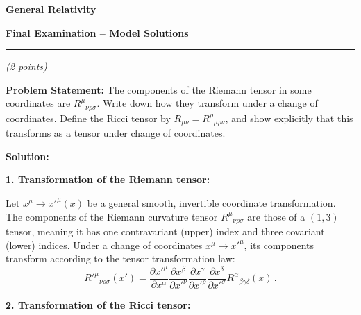 \documentclass[12pt]{article}
\newcommand{\be}{\begin{equation}}
\newcommand{\ee}{\end{equation}}
\newcounter{quesno}
\newcommand{\ques}[1]{\vspace{2em}\stepcounter{quesno}
\noindent{\bf Question \thequesno.} \emph{(#1 points)\\}
}
\begin{document}
\begin{center}
{\bf\Large General Relativity}

\vspace{1em}
{\bf\large Final Examination -- Model Solutions}
\end{center} 

\vspace{1em}
\hrule
\vspace{1em}

\ques{2} 
\textbf{Problem Statement:} The components of the Riemann tensor in some coordinates are $R^\mu{}_{\nu\rho\sigma}$. Write down how they transform under a change of coordinates. Define the Ricci tensor by $R_{\mu\nu} = R^\rho{}_{\mu\rho\nu}$, and show explicitly that this transforms as a tensor under change of coordinates.

\medskip
\noindent\textbf{Solution:}

\noindent\textbf{1. Transformation of the Riemann tensor:}

Let $x^\mu \to x'^\mu(x)$ be a general smooth, invertible coordinate transformation. The components of the Riemann curvature tensor $R^\mu{}_{\nu\rho\sigma}$ are those of a $(1,3)$ tensor, meaning it has one contravariant (upper) index and three covariant (lower) indices. Under a change of coordinates $x^\mu \to x'^\mu$, its components transform according to the tensor transformation law:
\be
R'^\mu{}_{\nu\rho\sigma}(x') = \frac{\partial x'^\mu}{\partial x^\alpha} \frac{\partial x^\beta}{\partial x'^\nu} \frac{\partial x^\gamma}{\partial x'^\rho} \frac{\partial x^\delta}{\partial x'^\sigma} R^\alpha{}_{\beta\gamma\delta}(x) \,.
\ee

\medskip
\noindent\textbf{2. Transformation of the Ricci tensor:}
\end{document}
